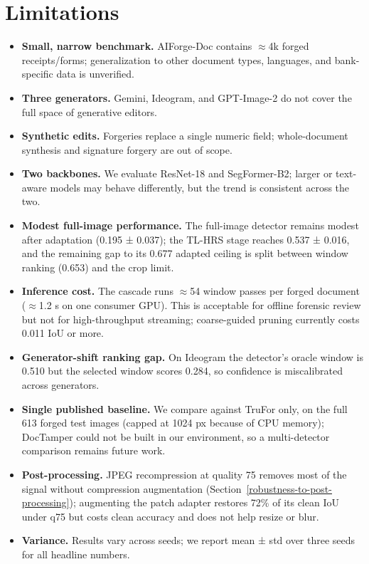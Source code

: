 \documentclass[preprint,12pt]{elsarticle}
\providecommand{\tightlist}{} %
\begin{document}
\bigskip

\section{Limitations}\label{limitations}

\begin{itemize}
\tightlist
\item
  \textbf{Small, narrow benchmark.} AIForge-Doc contains $\approx$4k forged receipts/forms; generalization to other document types, languages, and bank-specific data is unverified.
\item
  \textbf{Three generators.} Gemini, Ideogram, and GPT-Image-2 do not cover the full space of generative editors.
\item
  \textbf{Synthetic edits.} Forgeries replace a single numeric field; whole-document synthesis and signature forgery are out of scope.
\item
\textbf{Two backbones.} We evaluate ResNet-18 and SegFormer-B2; larger or text-aware models may behave differently, but the trend is consistent across the two.
\item
  \textbf{Modest full-image performance.} The full-image detector remains modest after adaptation (0.195 ± 0.037); the TL-HRS stage reaches 0.537 ± 0.016, and the remaining gap to its 0.677 adapted ceiling is split between window ranking (0.653) and the crop limit.
\item
  \textbf{Inference cost.} The cascade runs $\approx$54 window passes per forged document ($\approx$1.2 s on one consumer GPU). This is acceptable for offline forensic review but not for high-throughput streaming; coarse-guided pruning currently costs 0.011 IoU or more.
\item
  \textbf{Generator-shift ranking gap.} On Ideogram the detector's oracle window is 0.510 but the selected window scores 0.284, so confidence is miscalibrated across generators.
\item
  \textbf{Single published baseline.} We compare against TruFor only, on the full 613 forged test images (capped at 1024 px because of CPU memory); DocTamper could not be built in our environment, so a multi-detector comparison remains future work.
\item
  \textbf{Post-processing.} JPEG recompression at quality 75 removes most of the signal without compression augmentation (Section~\ref{robustness-to-post-processing}); augmenting the patch adapter restores 72\% of its clean IoU under q75 but costs clean accuracy and does not help resize or blur.
\item
  \textbf{Variance.} Results vary across seeds; we report mean ± std over three seeds for all headline numbers.
\end{itemize}
\end{document}
